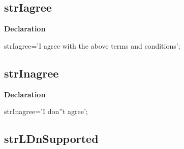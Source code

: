 \documentclass{report}
\newif\ifpdf
\begin{document}
\subsection*{strIagree}
\fi
\label{trstrings-strIagree}
\begin{list}{}{
\setlength{\itemindent}{0cm}
\setlength{\listparindent}{0cm}
\setlength{\leftmargin}{\evensidemargin}
\addtolength{\leftmargin}{\tmplength}
\settowidth{\labelsep}{X}
\addtolength{\leftmargin}{\labelsep}
\setlength{\labelwidth}{\tmplength}
}
\item[\textbf{Declaration}\hfill]
\ifpdf
\begin{flushleft}
\fi
\begin{ttfamily}
strIagree='I agree with the above terms and conditions';\end{ttfamily}

\ifpdf
\end{flushleft}
\fi

\end{list}
\ifpdf
\subsection*{\large{\textbf{strInagree}}\normalsize\hspace{1ex}\hrulefill}
\else
\subsection*{strInagree}
\fi
\label{trstrings-strInagree}
\begin{list}{}{
\setlength{\itemindent}{0cm}
\setlength{\listparindent}{0cm}
\setlength{\leftmargin}{\evensidemargin}
\addtolength{\leftmargin}{\tmplength}
\settowidth{\labelsep}{X}
\addtolength{\leftmargin}{\labelsep}
\setlength{\labelwidth}{\tmplength}
}
\item[\textbf{Declaration}\hfill]
\ifpdf
\begin{flushleft}
\fi
\begin{ttfamily}
strInagree='I don''t agree';\end{ttfamily}

\ifpdf
\end{flushleft}
\fi

\end{list}
\ifpdf
\subsection*{\large{\textbf{strLDnSupported}}\normalsize\hspace{1ex}\hrulefill}
\else
\end{document}
